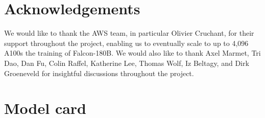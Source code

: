 \documentclass{article}
\begin{document}
\section{Acknowledgements}

We would like to thank the AWS team, in particular Olivier Cruchant, for their support throughout the project, enabling us to eventually scale to up to 4,096 A100s the training of Falcon-180B. We would also like to thank Axel Marmet, Tri Dao, Dan Fu, Colin Raffel, Katherine Lee, Thomas Wolf, Iz Beltagy, and Dirk Groeneveld for insightful discussions throughout the project.

\newpage

\vspace{-0.2in}
\section{Model card}
\vspace{-0.2in}
\end{document}
